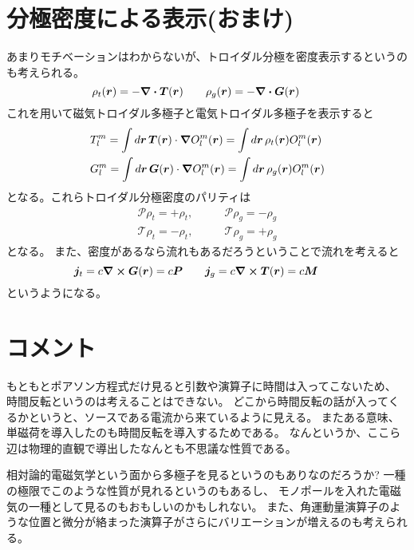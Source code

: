 \documentclass[../../master.tex]{subfiles}
\begin{document}
\section{分極密度による表示(おまけ)}
あまりモチベーションはわからないが、トロイダル分極を密度表示するというのも考えられる。
\begin{equation}
    \rho_t(\vb*{r}) = -\div \vb*{T}(\vb*{r}) \qquad
    \rho_g(\vb*{r}) = -\div \vb*{G}(\vb*{r}) \qquad
\end{equation}
これを用いて磁気トロイダル多極子と電気トロイダル多極子を表示すると
\begin{align}
    &T_l^m
    = \int d\vb*{r}\, \vb*{T}(\vb*{r})\cdot \grad O_l^m(\vb*{r})
    = \int d\vb*{r}\, \rho_t(\vb*{r}) O_l^m(\vb*{r})\\
    &G_l^m
    = \int d\vb*{r}\, \vb*{G}(\vb*{r})\cdot \grad O_l^m(\vb*{r})
    = \int d\vb*{r}\, \rho_g(\vb*{r}) O_l^m(\vb*{r})
\end{align}
となる。これらトロイダル分極密度のパリティは
\begin{align}
    \mathcal{P} \rho_t = + \rho_t, \qquad&
    \mathcal{P} \rho_g = - \rho_g \\
    \mathcal{T} \rho_t = - \rho_t, \qquad&
    \mathcal{T} \rho_g = + \rho_g
\end{align}
となる。
また、密度があるなら流れもあるだろうということで流れを考えると
\begin{equation}
    \vb*{j}_t = c \curl \vb*{G} (\vb*{r}) = c \vb*{P} \qquad
    \vb*{j}_g = c \curl \vb*{T} (\vb*{r}) = c \vb*{M} \qquad
\end{equation}
というようになる。

\section{コメント}
もともとポアソン方程式だけ見ると引数や演算子に時間は入ってこないため、
時間反転というのは考えることはできない。
どこから時間反転の話が入ってくるかというと、ソースである電流から来ているように見える。
またある意味、単磁荷を導入したのも時間反転を導入するためである。
なんというか、ここら辺は物理的直観で導出したなんとも不思議な性質である。

相対論的電磁気学という面から多極子を見るというのもありなのだろうか?
一種の極限でこのような性質が見れるというのもあるし、
モノポールを入れた電磁気の一種として見るのもおもしいのかもしれない。
また、角運動量演算子のような位置と微分が絡まった演算子がさらにバリエーションが増えるのも考えられる。
\end{document}
